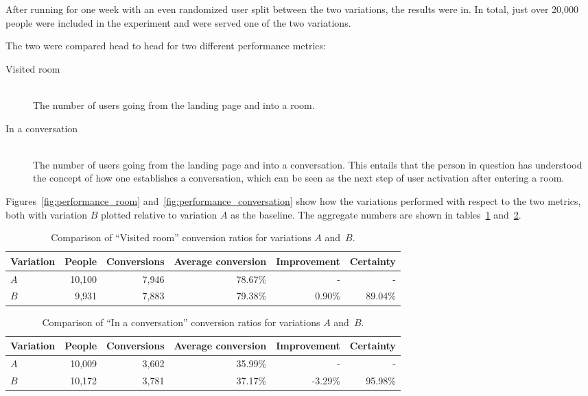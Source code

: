 After running for one week with an even randomized user split between the two variations, the results were in. In total, just over 20,000 people were included in the experiment and were served one of the two variations.

The two were compared head to head for two different performance metrics:

\begin{description}
  \item[Visited room] \hfill \\
    The number of users going from the landing page and into a room.
  \item[In a conversation] \hfill \\
    The number of users going from the landing page and into a conversation. This entails that the person in question has understood the concept of how one establishes a conversation, which can be seen as the next step of user activation after entering a room.
\end{description}

Figures~\ref{fig:performance_room} and~\ref{fig:performance_conversation} show how the variations performed with respect to the two metrics, both with variation $B$ plotted relative to variation $A$ as the baseline.
The aggregate numbers are shown in tables~\ref{tab:performance_room} and~\ref{tab:performance_conversation}.

\begin{table}[h]
  \begin{tabular}{|l|r|r|r|r|r|}
    \hline
    Variation & People & Conversions & Average conversion & Improvement & Certainty \\ \hline
    $A$       & 10,100 & 7,946       & 78.67\%            & -           & -         \\ \hline
    $B$       &  9,931 & 7,883       & 79.38\%            & 0.90\%      & 89.04\%   \\ \hline
  \end{tabular}
  \caption{Comparison of ``Visited room'' conversion ratios for variations $A$ and~$B$.}
  \label{tab:performance_room}
\end{table}

\begin{table}[h]
  \begin{tabular}{|l|r|r|r|r|r|}
    \hline
    Variation & People & Conversions & Average conversion & Improvement & Certainty \\ \hline
    $A$       & 10,009 & 3,602       & 35.99\%            & -           & -         \\ \hline
    $B$       & 10,172 & 3,781       & 37.17\%            & -3.29\%     & 95.98\%   \\ \hline
  \end{tabular}
  \caption{Comparison of ``In a conversation'' conversion ratios for variations $A$ and~$B$.}
  \label{tab:performance_conversation}
\end{table}

